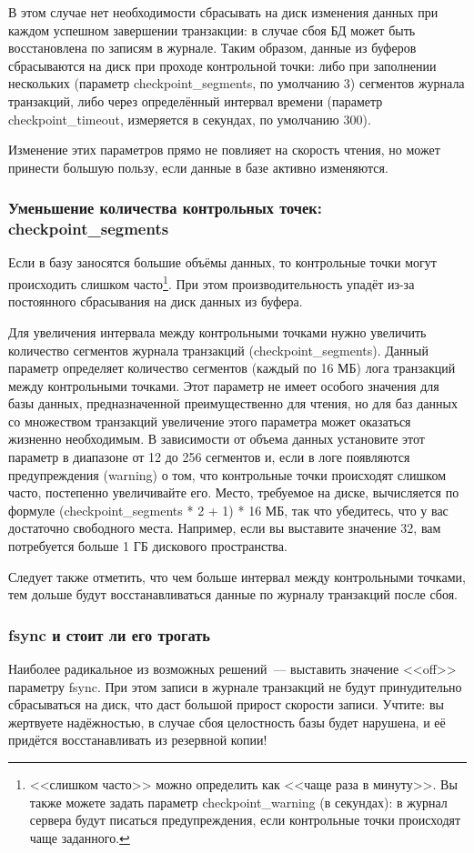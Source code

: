 В этом случае нет необходимости сбрасывать на диск изменения данных при каждом успешном завершении транзакции: 
в случае сбоя БД может быть восстановлена по записям в журнале. Таким образом, данные из буферов сбрасываются на диск 
при проходе контрольной точки: либо при заполнении нескольких (параметр checkpoint\_segments, по умолчанию 3) сегментов
журнала транзакций, либо через определённый интервал времени (параметр checkpoint\_timeout, измеряется в секундах, по умолчанию 300).

Изменение этих параметров прямо не повлияет на скорость чтения, но может принести большую пользу, если данные в базе активно изменяются.

\subsubsection{Уменьшение количества контрольных точек: checkpoint\_segments}
Если в базу заносятся большие объёмы данных, то контрольные точки могут происходить слишком часто\footnote{<<слишком часто>> 
можно определить как <<чаще раза в минуту>>. Вы также можете задать параметр checkpoint\_warning (в секундах): 
в журнал сервера будут писаться предупреждения, если контрольные точки происходят чаще заданного.}. 
При этом производительность упадёт из-за постоянного сбрасывания на диск данных из буфера.

Для увеличения интервала между контрольными точками нужно увеличить количество сегментов журнала транзакций (checkpoint\_segments). 
Данный параметр определяет количество сегментов (каждый по 16 МБ) лога транзакций между контрольными точками. 
Этот параметр не имеет особого значения для базы данных, предназначенной преимущественно для чтения, но для баз данных со 
множеством транзакций увеличение этого параметра может оказаться жизненно необходимым. В зависимости от объема данных 
установите этот параметр в диапазоне от 12 до 256 сегментов и, если в логе появляются предупреждения (warning) о том, что 
контрольные точки происходят слишком часто, постепенно увеличивайте его. Место, требуемое на диске, вычисляется по формуле 
(checkpoint\_segments * 2 + 1) * 16 МБ, так что убедитесь, что у вас достаточно свободного места. Например, если вы выставите 
значение 32, вам потребуется больше 1 ГБ дискового пространства.

Следует также отметить, что чем больше интервал между контрольными точками, тем дольше будут восстанавливаться данные по 
журналу транзакций после сбоя.

\subsubsection{fsync и стоит ли его трогать}
Наиболее радикальное из возможных решений~--- выставить значение <<off>> параметру fsync. При этом записи в журнале транзакций не 
будут принудительно сбрасываться на диск, что даст большой прирост скорости записи. Учтите: вы жертвуете надёжностью, в случае 
сбоя целостность базы будет нарушена, и её придётся восстанавливать из резервной копии!

